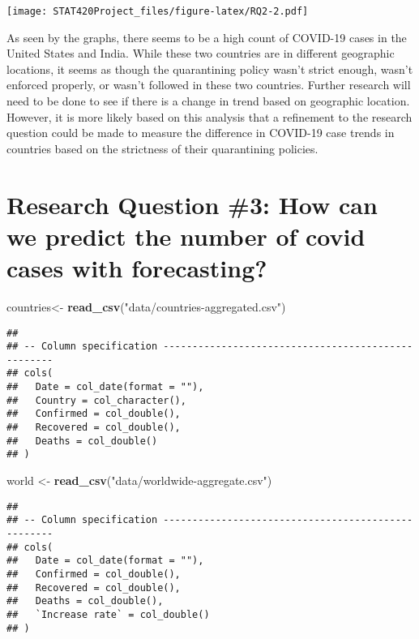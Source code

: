 \documentclass[]{article}
\newenvironment{Shaded}{\begin{snugshade}}{\end{snugshade}}
\newcommand{\KeywordTok}[1]{\textcolor[rgb]{0.13,0.29,0.53}{\textbf{#1}}}
\newcommand{\NormalTok}[1]{#1}
\newcommand{\StringTok}[1]{\textcolor[rgb]{0.31,0.60,0.02}{#1}}
\begin{document}
\texttt{[image: STAT420Project\_files/figure-latex/RQ2-2.pdf]}

As seen by the graphs, there seems to be a high count of COVID-19 cases
in the United States and India. While these two countries are in
different geographic locations, it seems as though the quarantining
policy wasn't strict enough, wasn't enforced properly, or wasn't
followed in these two countries. Further research will need to be done
to see if there is a change in trend based on geographic location.
However, it is more likely based on this analysis that a refinement to
the research question could be made to measure the difference in
COVID-19 case trends in countries based on the strictness of their
quarantining policies.

\hypertarget{research-question-3-how-can-we-predict-the-number-of-covid-cases-with-forecasting}{%
\section{Research Question \#3: How can we predict the number of covid
cases with
forecasting?}\label{research-question-3-how-can-we-predict-the-number-of-covid-cases-with-forecasting}}

\begin{Shaded}
\begin{Highlighting}[]
\NormalTok{countries<-}\StringTok{ }\KeywordTok{read_csv}\NormalTok{(}\StringTok{"data/countries-aggregated.csv"}\NormalTok{)}
\end{Highlighting}
\end{Shaded}

\begin{verbatim}
## 
## -- Column specification ---------------------------------------------------
## cols(
##   Date = col_date(format = ""),
##   Country = col_character(),
##   Confirmed = col_double(),
##   Recovered = col_double(),
##   Deaths = col_double()
## )
\end{verbatim}

\begin{Shaded}
\begin{Highlighting}[]
\NormalTok{world <-}\StringTok{ }\KeywordTok{read_csv}\NormalTok{(}\StringTok{"data/worldwide-aggregate.csv"}\NormalTok{)}
\end{Highlighting}
\end{Shaded}

\begin{verbatim}
## 
## -- Column specification ---------------------------------------------------
## cols(
##   Date = col_date(format = ""),
##   Confirmed = col_double(),
##   Recovered = col_double(),
##   Deaths = col_double(),
##   `Increase rate` = col_double()
## )
\end{verbatim}
\end{document}
